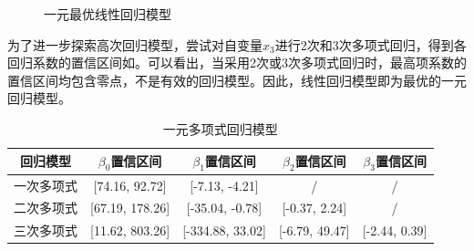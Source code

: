 \begin{figure}[H]
    \centering
    \caption{一元最优线性回归模型}
    \label{fig:ex7_single_linear}
\end{figure}

为了进一步探索高次回归模型，尝试对自变量$x_3$进行2次和3次多项式回归，得到各回归系数的置信区间如。可以看出，当采用2次或3次多项式回归时，最高项系数的置信区间均包含零点，不是有效的回归模型。因此，线性回归模型即为最优的一元回归模型。

\begin{table}[H]
    \centering
    \caption{一元多项式回归模型}
    \label{tab:ex7_single_poly}
    \begin{tabular}{c|cccc}
        \toprule
        回归模型 & \(\beta_0\)置信区间 & \(\beta_1\)置信区间 &
        \(\beta_2\)置信区间 & \(\beta_3\)置信区间\tabularnewline
        \midrule
        一次多项式 & [74.16, 92.72] & [-7.13, -4.21] & / &
        /\tabularnewline
        二次多项式 & [67.19, 178.26] & [-35.04, -0.78] & [-0.37, 2.24]
        & /\tabularnewline
        三次多项式 & [11.62, 803.26] & [-334.88, 33.02] &
        [-6.79, 49.47] & [-2.44, 0.39]\tabularnewline
        \bottomrule
    \end{tabular}
\end{table}

